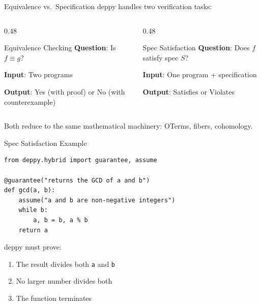 \documentclass[aspectratio=169,11pt]{beamer}
\begin{document}
\begin{frame}{Equivalence vs.\ Specification}
deppy handles two verification tasks:

\vspace{0.5em}
\begin{columns}
\begin{column}{0.48\textwidth}
\begin{block}{Equivalence Checking}
\textbf{Question}: Is $f \equiv g$?

\textbf{Input}: Two programs

\textbf{Output}: Yes (with proof) or No (with counterexample)
\end{block}
\end{column}
\begin{column}{0.48\textwidth}
\begin{block}{Spec Satisfaction}
\textbf{Question}: Does $f$ satisfy spec $S$?

\textbf{Input}: One program + specification

\textbf{Output}: Satisfies or Violates
\end{block}
\end{column}
\end{columns}

\vspace{0.5em}
Both reduce to the same mathematical machinery: OTerms, fibers,
cohomology.
\end{frame}

\begin{frame}[fragile]{Spec Satisfaction Example}
\begin{lstlisting}[language=deppy]
from deppy.hybrid import guarantee, assume

@guarantee("returns the GCD of a and b")
def gcd(a, b):
    assume("a and b are non-negative integers")
    while b:
        a, b = b, a % b
    return a
\end{lstlisting}

\vspace{0.5em}
deppy must prove:
\begin{enumerate}
\item The result divides both \texttt{a} and \texttt{b}
\item No larger number divides both
\item The function terminates
\end{enumerate}
\end{frame}
\end{document}
